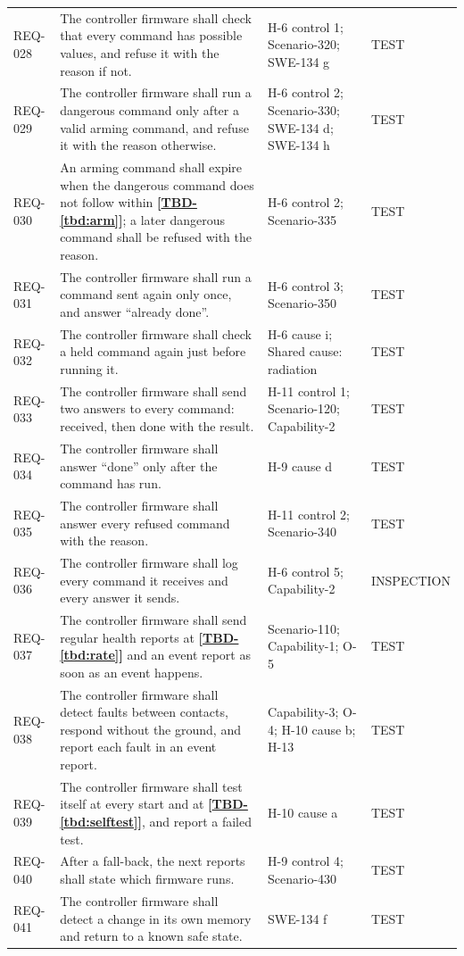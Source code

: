 \documentclass[11pt,a4paper]{article}
\newcommand{\tbd}[1]{\mbox{\textbf{[\hyperref[tbd:#1]{TBD-\ref*{tbd:#1}}]}}}
\begin{document}
{\begin{xltabular}{\textwidth}{@{}l>{\raggedright\arraybackslash}X>{\raggedright\arraybackslash}p{3.2cm}>{\raggedright\arraybackslash}p{3.0cm}@{}}
REQ-028 & The controller firmware shall check that every command has possible values, and refuse it with the reason if not. & H-6 control 1; Scenario-320; SWE-134 g & TEST \\
REQ-029 & The controller firmware shall run a dangerous command only after a valid arming command, and refuse it with the reason otherwise. & H-6 control 2; Scenario-330; SWE-134 d; SWE-134 h & TEST \\
REQ-030 & An arming command shall expire when the dangerous command does not follow within \tbd{arm}; a later dangerous command shall be refused with the reason. & H-6 control 2; Scenario-335 & TEST \\
REQ-031 & The controller firmware shall run a command sent again only once, and answer ``already done''. & H-6 control 3; Scenario-350 & TEST \\
REQ-032 & The controller firmware shall check a held command again just before running it. & H-6 cause i; Shared cause: radiation & TEST \\
REQ-033 & The controller firmware shall send two answers to every command: received, then done with the result. & H-11 control 1; Scenario-120; Capability-2 & TEST \\
REQ-034 & The controller firmware shall answer ``done'' only after the command has run. & H-9 cause d & TEST \\
REQ-035 & The controller firmware shall answer every refused command with the reason. & H-11 control 2; Scenario-340 & TEST \\
REQ-036 & The controller firmware shall log every command it receives and every answer it sends. & H-6 control 5; Capability-2 & INSPECTION \\
REQ-037 & The controller firmware shall send regular health reports at \tbd{rate} and an event report as soon as an event happens. & Scenario-110; Capability-1; O-5 & TEST \\
REQ-038 & The controller firmware shall detect faults between contacts, respond without the ground, and report each fault in an event report. & Capability-3; O-4; H-10 cause b; H-13 & TEST \\
REQ-039 & The controller firmware shall test itself at every start and at \tbd{selftest}, and report a failed test. & H-10 cause a & TEST \\
REQ-040 & After a fall-back, the next reports shall state which firmware runs. & H-9 control 4; Scenario-430 & TEST \\
REQ-041 & The controller firmware shall detect a change in its own memory and return to a known safe state. & SWE-134 f & TEST \\

\end{xltabular}}
\end{document}
